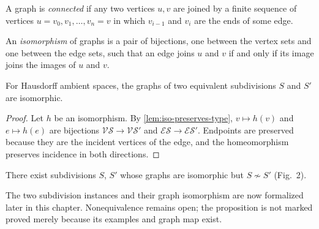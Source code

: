     \begin{definition}\label{def:graph-connected}

      A graph is \emph{connected} if any two vertices $u, v$ are joined by a
      finite sequence of vertices $u = v_0, v_1, \dots, v_n = v$ in which
      $v_{i-1}$ and $v_i$ are the ends of some edge.
    \end{definition}

    \begin{definition}\label{def:graph-iso}

      An \emph{isomorphism} of graphs is a pair of bijections, one between the
      vertex sets and one between the edge sets, such that an edge joins $u$
      and $v$ if and only if its image joins the images of $u$ and $v$.
    \end{definition}

    \begin{lemma}\label{lem:equiv-graph-iso}

      For Hausdorff ambient spaces, the graphs of two equivalent subdivisions
      $S$ and $S'$ are isomorphic.
    \end{lemma}
    \begin{proof}

      Let $h$ be an isomorphism. By \cref{lem:iso-preserves-type},
      $v \mapsto h(v)$ and $e \mapsto h(e)$ are bijections
      $\mathscr{V}\mathscr{S} \to \mathscr{V}\mathscr{S}'$ and
      $\mathscr{E}\mathscr{S} \to \mathscr{E}\mathscr{S}'$. Endpoints are
      preserved because they are the incident vertices of the edge, and the
      homeomorphism preserves incidence in both directions.
    \end{proof}

    \begin{proposition}\label{prop:graph-not-determining}
      \notready
      There exist subdivisions $S$, $S'$ whose graphs are isomorphic but
      $S \not\sim S'$ (Fig.~2).
    \end{proposition}
    The two subdivision instances and their graph isomorphism are now
    formalized later in this chapter. Nonequivalence remains open; the proposition
    is not marked proved merely because its examples and graph map exist.

